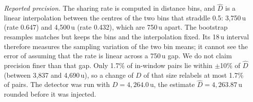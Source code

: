 \emph{Reported precision.} The sharing rate is computed in distance bins, and $\hat D$ is a linear
interpolation between the centres of the two bins that straddle 0.5: 3,750\,u (rate 0.647) and
4,500\,u (rate 0.432), which are 750\,u apart. The bootstrap resamples matches but keeps the bins and
the interpolation fixed. Its 18\,u interval therefore measures the sampling variation of the two bin
means; it cannot see the error of assuming that the rate is linear across a 750\,u gap. We do not claim
precision finer than that gap. Only 1.7\% of in-window pairs lie within $\pm$10\% of $\hat D$ (between
3,837 and 4,690\,u), so a change of $D$ of that size relabels at most 1.7\% of pairs. The detector was
run with $D = 4{,}264.0$\,u, the estimate $\hat D = 4{,}263.87$\,u rounded before it was injected.


